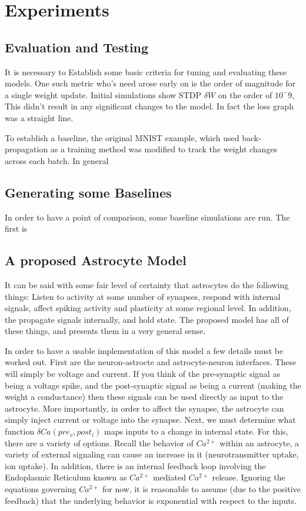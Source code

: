 %
%

\chapter{Experiments}\label{chapter:miles_and_tasks}
\section{Evaluation and Testing}
It is necessary to Establish some basic criteria for tuning and evaluating these models. One such metric who's need arose early on is the order of magnitude for a single weight update. Initial simulations show STDP $\delta W$ on the order of $10^-9$, This didn't result in any significant changes to the model. In fact the loss graph was a straight line.

To establish a baseline, the original MNIST example, which used back-propagation as a training method was modified to track the weight changes across each batch. In general 
\section{Generating some Baselines}
In order to have a point of comparison, some baseline simulations are run. The first is

\section{A proposed Astrocyte Model}
It can be said with some fair level of certainty that astrocytes do the following things: Listen to activity at some number of synapses, respond with internal signals, affect spiking activity and plasticity at some regional level. In addition, the propagate signals internally, and hold state. The proposed model has all of these things, and presents them in a very general sense.

In order to have a usable implementation of this model a few details must be worked out. First are the neuron-astrocte and astrocyte-neuron interfaces. These will simply be voltage and current. If you think of the pre-synaptic signal as being a voltage spike, and the post-synaptic signal as being a current (making the weight a conductance) then these signals can be used directly as input to the astrocyte. More importantly, in order to affect the synapse, the astrocyte can simply inject current or voltage into the synapse. Next, we must determine what function $\delta Ca(pre_v, post_i)$ maps inputs to a change in internal state. For this, there are a variety of options. Recall the behavior of $Ca^{2+}$ within an astrocyte, a variety of external signaling can cause an increase in it (neurotransmitter uptake, ion uptake). In addition, there is an internal feedback loop involving the Endoplasmic Reticulum known as $Ca^{2+}$ mediated $Ca^{2+}$ release. Ignoring the equations governing $Ca^{2+}$ for now, it is reasonable to assume (due to the positive feedback) that the underlying behavior is exponential with respect to the inputs.

